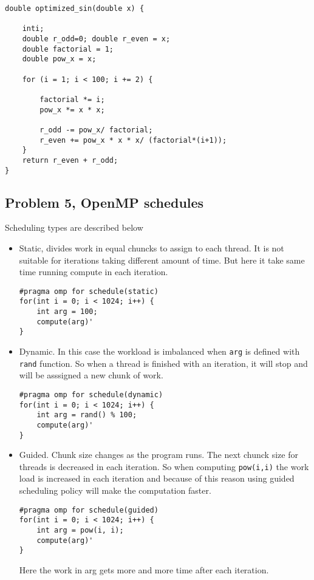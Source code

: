 \documentclass{article}
\begin{document}
\begin{lstlisting}[caption=Optimized function $sin(x)$ using Talor series.]
double optimized_sin(double x) {
    
    inti;
    double r_odd=0; double r_even = x;
    double factorial = 1;
    double pow_x = x;

    for (i = 1; i < 100; i += 2) {

        factorial *= i;
        pow_x *= x * x;

        r_odd -= pow_x/ factorial;
        r_even += pow_x * x * x/ (factorial*(i+1));
    }
    return r_even + r_odd;
}
\end{lstlisting}
\subsection{Problem 5, OpenMP schedules}
Scheduling types are described below
\begin{itemize}
    \item Static, divides work in equal chuncks to assign to each thread. It is not suitable for iterations taking different amount of time. But here it take same time running compute in each iteration.
\begin{lstlisting}
#pragma omp for schedule(static) 
for(int i = 0; i < 1024; i++) {
	int arg = 100;
	compute(arg)'
}
\end{lstlisting}
    \item Dynamic. In this case the workload is imbalanced when \texttt{arg} is defined with \texttt{rand} function. So when a thread is finished with an iteration, it will stop and will be asssigned a new chunk of work.
\begin{lstlisting}
#pragma omp for schedule(dynamic) 
for(int i = 0; i < 1024; i++) {
	int arg = rand() % 100;
	compute(arg)'
}
\end{lstlisting}

    \item Guided. Chunk size changes as the program runs. The next chunck size for threads is decreased in each iteration. So when computing \texttt{pow(i,i)} the work load is increased in each iteration and because of this reason using guided scheduling policy will make the computation faster.
\begin{lstlisting}
#pragma omp for schedule(guided)
for(int i = 0; i < 1024; i++) {
	int arg = pow(i, i);
	compute(arg)'
}
\end{lstlisting}
Here the work in arg gets more and more time after each iteration.
\end{itemize}
\end{document}
